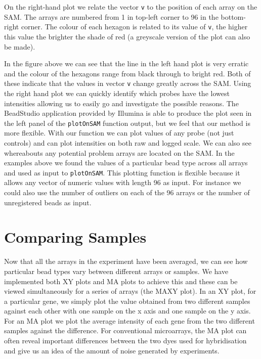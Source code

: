 \documentclass[a4paper]{article}
\newcommand{\Robject}[1]{{\texttt{#1}}}
\newcommand{\Rfunction}[1]{{\texttt{#1}}}
\begin{document}
On the right-hand plot we relate the vector \Robject{v} to the position of each array on the SAM. The arrays are numbered from 1 in top-left corner to 96 in the bottom-right corner. The colour of each hexagon is related to its value of \Robject{v}, the higher this value the brighter the shade of red (a greyscale version of the plot can also be made). 

In the figure above we can see that the line in the left hand plot is very erratic and the colour of the hexagons range from black through to bright red.  Both of these indicate that the values in vector \Robject{v} change greatly across the SAM.  Using the right hand plot we can quickly identify which probes have the lowest intensities allowing us to easily go and investigate the possible reasons. The BeadStudio application provided by Illumina is able to produce the plot seen in the left panel of the \Rfunction{plotOnSAM} function output, but we feel that our method is more flexible. With our function we can plot values of any 
probe (not just controls) and can plot intensities on both raw and logged scale. We can also see whereabouts any potential problem arrays are located on the SAM. In the examples above we found the values of a particular bead type across all arrays and used as input to \Rfunction{plotOnSAM}. This plotting function is flexible because it allows any vector of numeric values with length 96 as input. For instance we could also use the number of outliers on each of the 96 arrays or the number of unregistered beads as input. 


\section{Comparing Samples}
\label{comparing_samples}

Now that all the arrays in the experiment have been averaged, we can
see how particular bead types vary between different arrays or
samples. We have implemented both XY plots and MA plots to achieve
this and these can be viewed simultaneously for a series of arrays
(the MAXY plot).
In an XY plot, for a particular gene, we simply plot the value obtained from two different samples against each other with one sample on the x axis and one sample on the y axis. For an MA plot we plot the average intensity 
of each gene from the two different samples against the difference. For conventional microarrays, the MA plot can often reveal important differences between the two dyes used for hybridisation and give us an idea of the 
amount of noise generated by experiments. 
\end{document}
